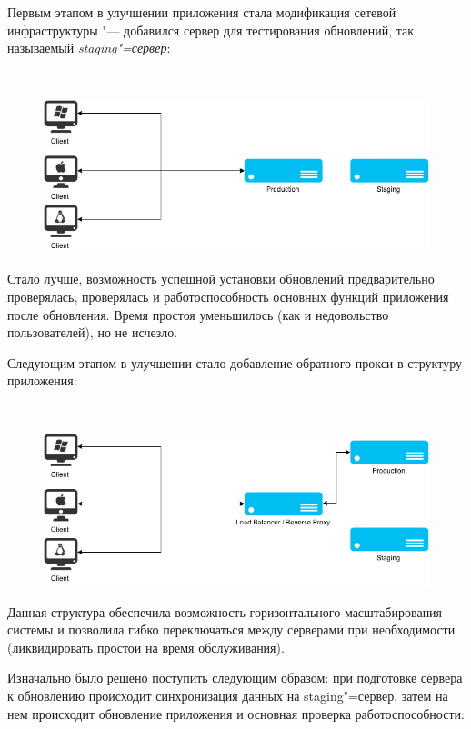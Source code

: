 \documentclass[10pt, a5paper]{article}
\begin{document}
Первым этапом в улучшении приложения стала модификация сетевой инфраструктуры "--- добавился сервер для тестирования обновлений, так называемый \emph{staging"=сервер}:

~

\begin{figure}[h!]
  \centering
  \includegraphics[scale=0.36]{02_2015_02_staging}
\end{figure}

Стало лучше, возможность успешной установки обновлений \linebreak предварительно проверялась, проверялась и работоспособность основных функций приложения после обновления. Время простоя уменьшилось (как и недовольство пользователей), но не исчезло.

Следующим этапом в улучшении стало добавление обратного прокси в структуру приложения:

~

\begin{figure}[h!]
  \centering
  \includegraphics[scale=0.36]{02_2015_03_working}
\end{figure}

Данная структура обеспечила возможность горизонтального \linebreak масштабирования системы и позволила гибко переключаться между серверами при необходимости (ликвидировать простои на время обслуживания).


Изначально было решено поступить следующим образом: при подготовке сервера к обновлению происходит синхронизация данных на staging"=сервер, затем на нем происходит обновление приложения и основная проверка работоспособности:
\end{document}
